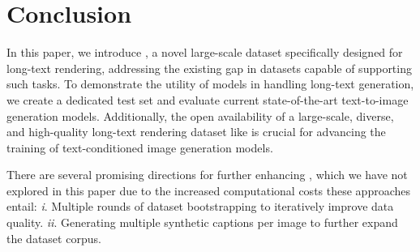 \section{Conclusion}

In this paper, we introduce \DatasetName, a novel large-scale dataset specifically designed for long-text rendering, addressing the existing gap in datasets capable of supporting such tasks. 
To demonstrate the utility of models in handling long-text generation, we create a dedicated test set and evaluate current state-of-the-art text-to-image generation models.
Additionally, the open availability of a large-scale, diverse, and high-quality long-text rendering dataset like \DatasetName is crucial for advancing the training of text-conditioned image generation models.

There are several promising directions for further enhancing \DatasetName, which we have not explored in this paper due to the increased computational costs these approaches entail: \emph{i}. Multiple rounds of dataset bootstrapping to iteratively improve data quality. \emph{ii}. Generating multiple synthetic captions per image to further expand the dataset corpus.